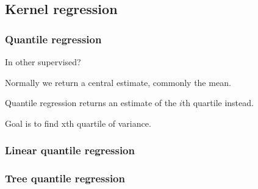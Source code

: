 
\subsection{Kernel regression}

\subsubsection{Quantile regression}

In other supervised?

Normally we return a central estimate, commonly the mean.

Quantile regression returns an estimate of the \(i\)th quartile instead.

Goal is to find xth quartile of variance.

\subsubsection{Linear quantile regression}

\subsubsection{Tree quantile regression}


